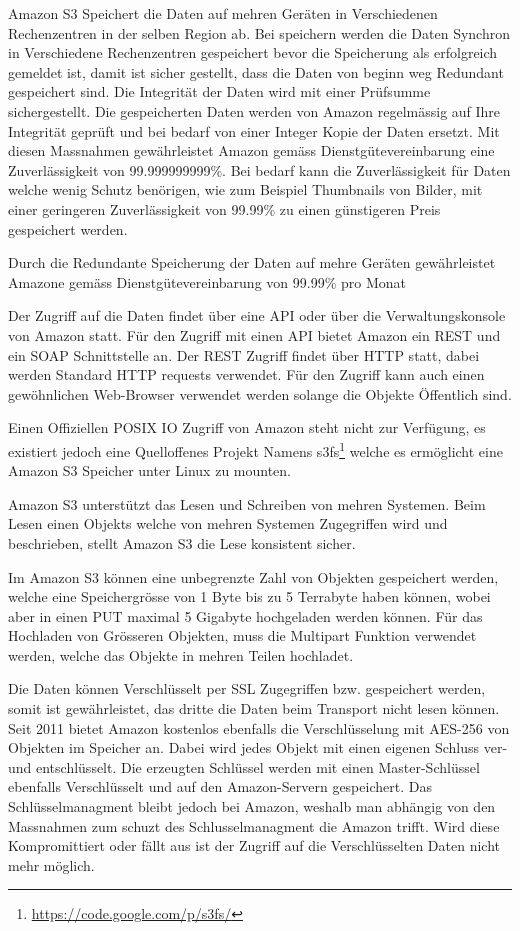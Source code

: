 Amazon S3 Speichert die Daten auf mehren Geräten in Verschiedenen Rechenzentren in der selben Region ab. Bei speichern werden die Daten Synchron in Verschiedene Rechenzentren gespeichert bevor die Speicherung als erfolgreich gemeldet ist, damit ist sicher gestellt, dass die Daten von beginn weg Redundant gespeichert sind. Die Integrität der Daten wird mit einer Prüfsumme sichergestellt. Die gespeicherten Daten werden von Amazon regelmässig auf Ihre Integrität geprüft und bei bedarf von einer Integer Kopie der Daten ersetzt. Mit diesen Massnahmen gewährleistet Amazon gemäss Dienstgütevereinbarung eine Zuverlässigkeit von 99.999999999\%. Bei bedarf kann die Zuverlässigkeit für Daten welche wenig Schutz benörigen, wie zum Beispiel Thumbnails von Bilder, mit einer geringeren Zuverlässigkeit von 99.99\% zu einen günstigeren Preis gespeichert werden.\cite{Amazon2007}

Durch die Redundante Speicherung der Daten auf mehre Geräten gewährleistet Amazone gemäss Dienstgütevereinbarung von 99.99\% pro Monat

Der Zugriff auf die Daten findet über eine API oder über die Verwaltungskonsole von Amazon statt. Für den Zugriff mit einen API bietet Amazon ein \gls{REST} und ein \gls{SOAP} Schnittstelle an. Der \gls{REST} Zugriff findet über HTTP statt, dabei werden Standard HTTP requests verwendet. Für den Zugriff kann auch einen gewöhnlichen Web-Browser verwendet werden solange die Objekte Öffentlich sind.

Einen Offiziellen POSIX IO Zugriff von Amazon steht nicht zur Verfügung, es existiert jedoch eine Quelloffenes Projekt Namens s3fs\footnote{\url{https://code.google.com/p/s3fs/}} welche es ermöglicht eine Amazon S3 Speicher unter Linux zu mounten. \cite{S3fs}

Amazon S3 unterstützt das Lesen und Schreiben von mehren Systemen. Beim Lesen einen Objekts welche von mehren Systemen Zugegriffen wird und beschrieben, stellt Amazon S3 die Lese konsistent sicher.\cite{Amazon2012a}

Im Amazon S3 können eine unbegrenzte Zahl von Objekten gespeichert werden, welche eine Speichergrösse von 1 Byte bis zu 5 Terrabyte haben können, wobei aber in einen PUT maximal 5 Gigabyte hochgeladen werden können. Für das Hochladen von Grösseren Objekten, muss die Multipart Funktion verwendet werden, welche das Objekte in mehren Teilen hochladet.\cite{Amazon2012b}

Die Daten können Verschlüsselt per SSL Zugegriffen bzw. gespeichert werden, somit ist gewährleistet, das dritte die Daten beim Transport nicht lesen können. Seit 2011 bietet Amazon kostenlos ebenfalls die Verschlüsselung mit AES-256 von Objekten im Speicher an. Dabei wird jedes Objekt mit einen eigenen Schluss ver- und entschlüsselt. Die erzeugten Schlüssel werden mit einen Master-Schlüssel ebenfalls Verschlüsselt und auf den Amazon-Servern gespeichert. Das Schlüsselmanagment bleibt jedoch bei Amazon, weshalb man abhängig von den Massnahmen zum schuzt des Schlusselmanagment die Amazon trifft. Wird diese Kompromittiert oder fällt aus ist der Zugriff auf die Verschlüsselten Daten nicht mehr möglich.\cite{RobertLippert2011}

